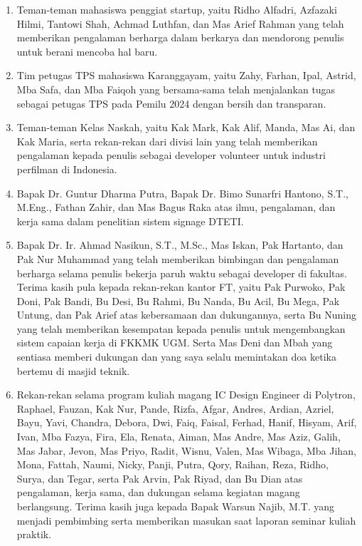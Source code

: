 \begin{enumerate}
	\item Teman-teman mahasiswa penggiat startup, yaitu Ridho Alfadri, Azfazaki
	Hilmi, Tantowi Shah, Achmad Luthfan, dan Mas Arief Rahman yang telah
	memberikan pengalaman berharga dalam berkarya dan mendorong penulis untuk
	berani mencoba hal baru.

	\item Tim petugas TPS mahasiswa Karanggayam, yaitu Zahy, Farhan, Ipal,
	Astrid, Mba Safa, dan Mba Faiqoh yang bersama-sama telah menjalankan tugas
	sebagai petugas TPS pada Pemilu 2024 dengan bersih dan transparan.

	\item Teman-teman Kelas Naskah, yaitu Kak Mark, Kak Alif, Manda, Mas Ai,
	dan Kak Maria, serta rekan-rekan dari divisi lain yang telah memberikan
	pengalaman kepada penulis sebagai developer volunteer untuk industri
	perfilman di Indonesia.

	\item Bapak Dr. Guntur Dharma Putra, Bapak Dr. Bimo Sunarfri Hantono,
	S.T., M.Eng., Fathan Zahir, dan Mas Bagus Raka atas ilmu, pengalaman, dan
	kerja sama dalam penelitian sistem signage DTETI.
	
	\item Bapak Dr. Ir. Ahmad Nasikun, S.T., M.Sc., Mas Iskan, Pak Hartanto,
	dan Pak Nur Muhammad yang telah memberikan bimbingan dan pengalaman
	berharga selama penulis bekerja paruh waktu sebagai developer di fakultas.
	Terima kasih pula kepada rekan-rekan kantor FT, yaitu Pak Purwoko, Pak
	Doni, Pak Bandi, Bu Desi, Bu Rahmi, Bu Nanda, Bu Acil, Bu Mega, Pak
	Untung, dan Pak Arief atas kebersamaan dan dukungannya, serta Bu Nuning
	yang telah memberikan kesempatan kepada penulis untuk mengembangkan sistem
	capaian kerja di FKKMK UGM. Serta Mas Deni dan Mbah yang sentiasa memberi dukungan dan yang saya selalu memintakan doa ketika bertemu di masjid teknik.
	
	\item Rekan-rekan selama program kuliah magang IC Design Engineer di Polytron,
	Raphael, Fauzan, Kak Nur, Pande, Rizfa, Afgar, Andres, Ardian, Azriel, Bayu,
	Yavi, Chandra, Debora, Dwi, Faiq, Faisal, Ferhad, Hanif, Hisyam, Arif, Ivan,
	Mba Fazya, Fira, Ela, Renata, Aiman, Mas Andre, Mas Aziz, Galih, Mas Jabar,
	Jevon, Mas Priyo, Radit, Wisnu, Valen, Mas Wibaga, Mba Jihan, Mona, Fattah,
	Naumi, Nicky, Panji, Putra, Qory, Raihan, Reza, Ridho, Surya, dan Tegar,
	serta Pak Arvin, Pak Riyad, dan Bu Dian atas pengalaman, kerja sama, dan
	dukungan selama kegiatan magang berlangsung. Terima kasih juga kepada Bapak
	Warsun Najib, M.T. yang menjadi pembimbing serta memberikan masukan saat
	laporan seminar kuliah praktik.
	

\end{enumerate}
